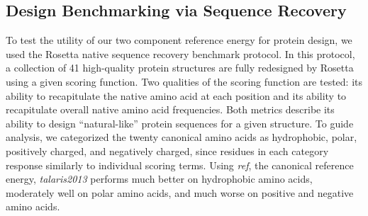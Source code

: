 \subsection{Design Benchmarking via Sequence Recovery}
To test the utility of our two component reference energy for protein design, we used the Rosetta native sequence recovery benchmark protocol\cite{leaver-fay_chapter_2013}.
In this protocol, a collection of 41 high-quality protein structures are fully redesigned by Rosetta using a given scoring function.
Two qualities of the scoring function are tested: its ability to recapitulate the native amino acid at each position and its ability to recapitulate overall native amino acid frequencies.
Both metrics describe its ability to design ``natural-like'' protein sequences for a given structure.
To guide analysis, we categorized the twenty canonical amino acids as hydrophobic, polar, positively charged, and negatively charged, since residues in each category response similarly to individual scoring terms.
Using \textit{ref}, the canonical reference energy, \textit{talaris2013} performs much better on hydrophobic amino acids, moderately well on polar amino acids, and much worse on positive and negative amino acids.

